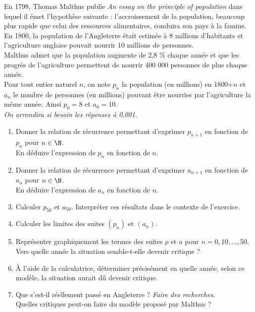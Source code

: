 \documentclass[a4paper,11pt,exos]{nsi} %
\begin{document}
\maketitle

En 1798, Thomas Malthus publie \textit{An essay on the principle of population} dans lequel il émet l'hypothèse suivante : l'accroissement de la population, beaucoup plus rapide que celui des ressources alimentaires, conduira son pays à la famine.\\[.5em]
En 1800, la population de l'Angleterre était estimée à 8 millions d'habitants et l'agriculture anglaise pouvait nourrir 10 millions de personnes.\\
Malthus admet que la population augmente de 2,8 \% chaque année et que les progrès de l'agriculture permettent de nourrir 400 000 personnes de plus chaque année.\\[.5em]
Pour tout entier naturel $n$, on note $p_n$ la population (en millions) en 1800$+n$ et $a_n$ le nombre de personnes (en millions) pouvant être nourries par l'agriculture la même année. Ainsi $p_0=8$ et $a_0=10$. \\[.5em]
\textit{On arrondira si besoin les réponses à 0,001.}

\begin{enumerate}
    \item Donner la relation de récurrence permettant d'exprimer $p_{n+1}$ en fonction de $p_n$ pour $n\in\N$.\\
    En déduire l'expression de $p_n$ en fonction de $n$.
    
    \item Donner la relation de récurrence permettant d'exprimer $a_{n+1}$ en fonction de $a_n$ pour $n\in\N$.\\
    En déduire l'expression de $a_n$ en fonction de $n$.

    \item Calculer $p_{50}$ et $a_{50}$. 
    Interpréter ces résultats dans le contexte de l'exercice.

    \item Calculer les limites des suites $(p_n)$ et $(a_n)$.
   
    \item Représenter graphiquement les termes des suites $p$ et $a$ pour $n=0, 10, ..., 50$.\\
    Vers quelle année la situation semble-t-elle devenir critique ?
    \item À l'aide de la calculatrice, déterminer précisément en quelle année, selon ce modèle, la situation aurait dû devenir critique.
    \item Que s'est-il réellement passé en Angleterre ? \textit{Faire des recherches.}\\
    Quelles critiques peut-on faire du modèle proposé par Malthus ?
\end{enumerate}
\end{document}
